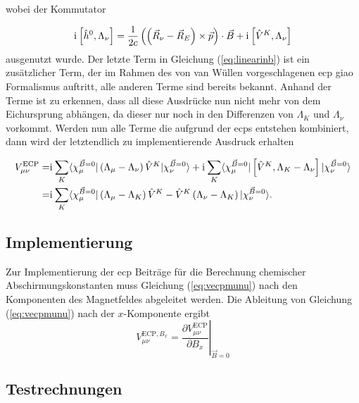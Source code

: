 	wobei der Kommutator
	
	\begin{equation}
	\mathrm{i}\mkern1mu\left[\hat{h}^0 ,\Lambda_\nu\right]=\frac{1}{2c}\left(\left(\vec{R}_\nu-\vec{R}_E\right)\times\vec{p}\right)\cdot\vec{B}+\mathrm{i}\mkern1mu\left[\hat{V}^K ,\Lambda_\nu\right]
	\end{equation}
	ausgenutzt wurde. Der letzte Term in Gleichung (\ref{eq:linearinb}) ist ein zusätzlicher Term, der im Rahmen des von van Wüllen vorgeschlagenen \ac{ecp} \ac{giao} Formalismus auftritt, alle anderen Terme sind bereits bekannt. Anhand der Terme ist zu erkennen, dass all diese Ausdrücke nun nicht mehr von dem Eichursprung abhängen, da dieser nur noch in den Differenzen von $\Lambda_K$ und $\Lambda_\nu$ vorkommt. Werden nun alle Terme die aufgrund der \acp{ecp} entstehen kombiniert, dann wird der letztendlich zu implementierende Ausdruck erhalten
	
	\begin{equation}\label{eq:vecpmunu}
	\begin{aligned}
	V_{\mu\nu}^{\textrm{ECP}}=&\mathrm{i}\mkern1mu\sum_K\langle\chi_\mu^{\vec{B}=0}\vert\left(\Lambda_\mu -\Lambda_\nu\right)\hat{V}^K\vert\chi_\nu^{\vec{B}=0}\rangle+\mathrm{i}\mkern1mu\sum_K\langle \chi_\mu^{\vec{B}=0}\vert\left[\hat{V}^{K},\Lambda_K-\Lambda_\nu\right]\vert\chi_\nu^{\vec{B}=0}\rangle\\
	=&\mathrm{i}\mkern1mu\sum_K\langle\chi_\mu^{\vec{B}=0}\vert\left(\Lambda_\mu -\Lambda_K\right)\hat{V}^K-\hat{V}^K\left(\Lambda_\nu -\Lambda_K\right)\vert\chi_\nu^{\vec{B}=0}\rangle .
	\end{aligned}
	\end{equation}
	
	\subsection{Implementierung}
	Zur Implementierung der \ac{ecp} Beiträge für die Berechnung chemischer Abschirmungskonstanten muss Gleichung (\ref{eq:vecpmunu}) nach den Komponenten des Magnetfeldes abgeleitet werden. Die Ableitung von Gleichung (\ref{eq:vecpmunu}) nach der $x$-Komponente ergibt
	\begin{equation}
	V_{\mu\nu}^{\textrm{ECP},B_x}=\left.\frac{\partial V_{\mu\nu}^{\textrm{ECP}}}{\partial B_x}\right\vert_{\vec{B}=0}
	\end{equation}
	\subsection{Testrechnungen}
	
